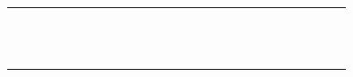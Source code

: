 \begin{table}
\begin{tabular}{p{4.5cm}*{26}{D}}
\citet{peiselerCarbonFootprintDistributions2024} &  & \X & \X &  & \X &  &  & \X & \X &  & \X &  &  &  & \X &  &  &  & \X &  &  & \X &  & \X &  & \X \\
\anonstrut\textcolor{codelabel}{} & \X &  &  &  &  &  & \X &  &  & \X &  & \X &  & \X & \X & \X & \X &  &  &  &  &  &  &  &  &  \\
\anonstrut\textcolor{codelabel}{} & \X &  & \X & \X &  &  &  &  &  & \X &  & \X &  &  & \X & \X & \X &  &  &  &  &  &  &  &  &  \\
\anonstrut\textcolor{codelabel}{} & \X &  &  & \X &  &  &  &  &  & \X &  &  &  &  & \X &  &  &  &  &  &  &  &  &  &  &  \\
\anonstrut\textcolor{codelabel}{} & \X &  & \X & \X &  &  &  &  &  & \X & \X &  &  &  & \X & \X & \X &  &  &  & \X &  &  &  & \X &  \\
\anonstrut\textcolor{codelabel}{} &  & \X & \X & \X &  &  &  &  &  & \X &  & \X &  &  &  &  & \X &  &  &  &  &  &  & \X &  &  \\
\anonstrut\textcolor{codelabel}{} & \X &  &  &  & \X &  &  &  &  & \X & \X &  &  & \X & \X & \X & \X &  &  &  &  &  &  &  & \X &  \\
\anonstrut\textcolor{codelabel}{} & \X &  &  &  & \X &  &  &  &  & \X &  &  &  &  & \X &  &  & \X &  &  &  &  &  &  &  &  \\
\anonstrut\textcolor{codelabel}{} & \X &  & \X &  & \X &  &  & \X &  & \X &  &  &  &  & \X & \X & \X &  &  &  &  &  &  &  &  & \X \\
\anonstrut\textcolor{codelabel}{} & \X &  & \X &  & \X & \X & \X &  &  & \X &  & \X & \X &  &  &  &  &  &  & \X &  &  &  &  &  &  \\
\citet{sunRobustAssessmentsLithium2025} & \X &  & \X & \X & \X & \X & \X &  & \X & \X & \X &  &  &  & \X &  & \X &  &  &  & \X & \X &  &  &  &  \\
\anonstrut\textcolor{codelabel}{} &  & \X & \X &  & \X & \X &  &  &  &  &  &  & \X & \X & \X &  &  &  &  & \X &  &  &  &  &  &  \\
\anonstrut\textcolor{codelabel}{} & \X &  & \X & \X & \X & \X & \X &  &  & \X &  & \X &  &  &  &  &  &  &  & \X &  &  &  &  &  &  \\

\end{tabular}
\end{table}
